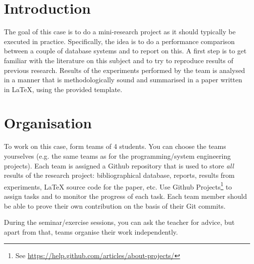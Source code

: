 \documentclass[fleqn,10pt]{artikeltin}
\affiliation{\textbf{Contact:}
  \textsuperscript{1} \href{mailto:jens.buysse@hogent.be}{jens.buysse@hogent.be};
  \textsuperscript{2} \href{mailto:anita.bernard@hogent.be}{anita.bernard@hogent.be};
  \textsuperscript{3} \href{mailto:bert.vanvreckem@hogent.be}{bert.vanvreckem@hogent.be}}
\begin{document}
\maketitle %
\tableofcontents %
\thispagestyle{empty} %


\section{Introduction} %
\label{sec:introduction}

The goal of this case is to do a mini-research project as it should typically be executed in practice. Specifically, the idea is to do a performance comparison between a couple of database systems and to report on this. A first step is to get familiar with the literature on this subject and to try to reproduce results of previous research. Results of the experiments performed by the team is analysed in a manner that is methodologically sound and summarised in a paper written in {\LaTeX}, using the provided template.

\section{Organisation}
\label{sec:organisation}

To work on this case, form teams of 4 students. You can choose the teams yourselves (e.g. the same teams as for the programming/system engineering projects). Each team is assigned a Github repository that is used to store \emph{all} results of the research project: bibliographical database, reports, results from experiments, {\LaTeX} source code for the paper, etc. Use Github Projects\footnote{See \url{https://help.github.com/articles/about-projects/}} to assign tasks and to monitor the progress of each task. Each team member should be able to prove their own contribution on the basis of their Git commits.

During the seminar/exercise sessions, you can ask the teacher for advice, but apart from that, teams organise their work independently.
\end{document}
